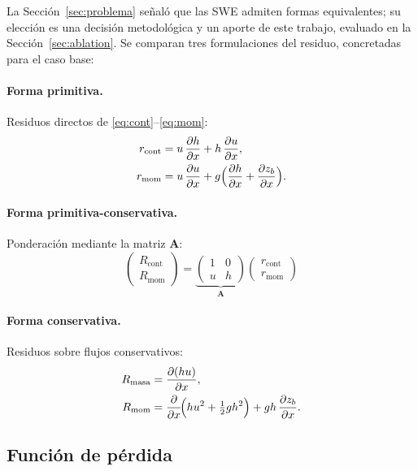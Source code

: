 La Sección~\ref{sec:problema} señaló que las SWE admiten formas equivalentes;
su elección es una decisión metodológica y un aporte de este trabajo, evaluado
en la Sección~\ref{sec:ablation}. Se comparan tres formulaciones del residuo,
concretadas para el caso base:

\paragraph{Forma primitiva.}
Residuos directos de \eqref{eq:cont}--\eqref{eq:mom}:
\begin{align}
  r_{\text{cont}} &= u\,\frac{\partial h}{\partial x} + h\,\frac{\partial u}{\partial x}, \label{eq:r-prim-cont}\\
  r_{\text{mom}}  &= u\,\frac{\partial u}{\partial x} + g\Big(\frac{\partial h}{\partial x} + \frac{\partial z_b}{\partial x}\Big).
    \label{eq:r-prim-mom}
\end{align}

\paragraph{Forma primitiva-conservativa.}
Ponderación mediante la matriz $\bm{A}$:
\begin{equation}
  \begin{pmatrix} R_{\text{cont}} \\ R_{\text{mom}} \end{pmatrix}
  = \underbrace{\begin{pmatrix} 1 & 0 \\ u & h \end{pmatrix}}_{\bm{A}}
  \begin{pmatrix} r_{\text{cont}} \\ r_{\text{mom}} \end{pmatrix}
  \label{eq:primcons}
\end{equation}

\paragraph{Forma conservativa.}
Residuos sobre flujos conservativos:
\begin{align}
  R_{\text{masa}} &= \frac{\partial (hu)}{\partial x}, \label{eq:r-cons-masa}\\
  R_{\text{mom}}  &= \frac{\partial }{\partial x}\!\Big(hu^2 + \tfrac{1}{2}gh^2\Big)
                     + gh\,\frac{\partial z_b}{\partial x}. \label{eq:r-cons-mom}
\end{align}

\subsection{Función de pérdida}

